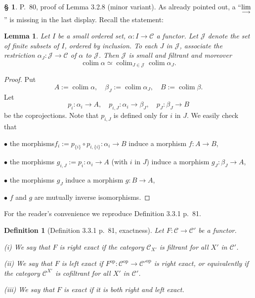 \documentclass[12pt]{article}
\newtheorem{lem}[thm]{Lemma}
\newtheorem{df}[thm]{Definition}
\theoremstyle{remark}
\theoremstyle{definition}
\newtheorem{s}[thm]{\S}
\newcommand{\bu}{\bullet}
\newcommand{\nn}{\noindent}
\newcommand{\cc}{\mathcal}
\newcommand{\C}{\mathcal C}
\newcommand{\ilim}{\operatornamewithlimits{\underset{\longrightarrow}{lim}}}
\DeclareMathOperator*{\colim}{colim}
\DeclareMathOperator{\op}{op}
\begin{document}
\begin{s} 
P.~80, proof of Lemma 3.2.8 (minor variant). As already pointed out, a ``$\ds\ilim$'' is missing in the last display. Recall the statement:
\begin{lem}
Let $I$ be a small ordered set, $\alpha:I\to\C$ a functor. Let $\cc J$ denote the set of finite subsets of $I$, ordered by inclusion. To each $J$ in $\cc J$, associate the restriction $\alpha_J:\cc J\to\C$ of $\alpha$ to $\cc J$. Then $\cc J$ is small and filtrant and moreover
$$
\colim\alpha\simeq\colim_{J\in\cc J}\colim\alpha_J.
$$
\end{lem}
\begin{proof}
Put
$$
A:=\colim\alpha,\quad
\beta_J:=\colim\alpha_J,\quad
B:=\colim\beta.
$$
Let 
$$
p_i:\alpha_i\to A,\quad 
p_{i,J}:\alpha_i\to\beta_J,\quad 
p_J:\beta_J\to B
$$
be the coprojections. Note that $p_{i,J}$ is defined only for $i$ in $J$. We easily check that 

\nn$\bu$ the morphisms$f_i:=p_{\{i\}}\circ p_{i,\{i\}}:\alpha_i\to B$ induce a morphism $f:A\to B$, 

\nn$\bu$ the morphisms $g_{i,J}:=p_i:\alpha_i\to A$ (with $i$ in $J$) induce a morphism $g_J:\beta_J\to A$, 

\nn$\bu$ the morphisms $g_J$ induce a morphism $g:B\to A$, 

\nn$\bu$ $f$ and $g$ are mutually inverse isomorphisms.
\end{proof}
\end{s}

% 

For the reader's convenience we reproduce Definition 3.3.1 p.~81. 

\begin{df}[Definition 3.3.1 p.~81, exactness] 
Let $F:\C\to\C'$ be a functor.

\nn\emph{(i)} We say that $F$ is \emph{right exact} if the category $\C_{X'}$ is filtrant for all $X'$ in $\C'$. 

\nn\emph{(ii)} We say that $F$ is \emph{left exact} if $F^{\op}:\C^{\op}\to\C'^{\op}$ is right exact, or equivalently if the category $\C^{X'}$ is cofiltrant for all $X'$ in $\C'$.

\nn\emph{(iii)} We say that $F$ is \emph{exact} if it is both right and left exact.
\end{df}
\end{document}
